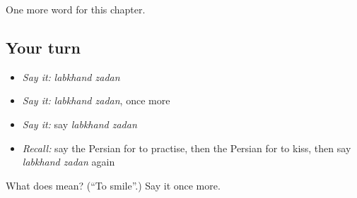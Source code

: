 \begin{grammarlens}[title={What you've built}]
One more word for this chapter.
\end{grammarlens}

\subsection*{Your turn}
\begin{itemize}
\raggedright
  \item \emph{Say it:} \emph{labkhand zadan}
  \item \emph{Say it:} \emph{labkhand zadan}, once more
  \item \emph{Say it:} say \emph{labkhand zadan}
  \item \emph{Recall:} say the Persian for to practise, then the Persian for to kiss, then say \emph{labkhand zadan} again
\end{itemize}

\begin{tcolorbox}[breakable,colback=teal!4,colframe=teal!35!black,title={Before you move on}]
What does   mean? (\textquotedblleft{}To smile\textquotedblright{}.) Say it once more.
\end{tcolorbox}
